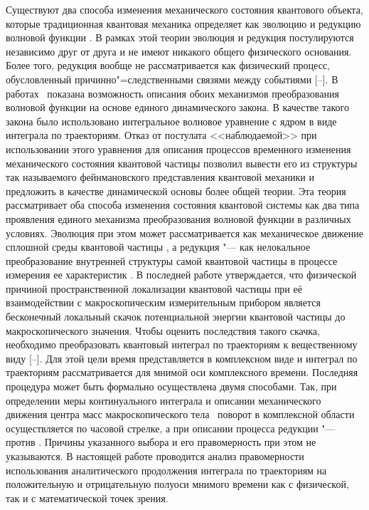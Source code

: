   Существуют два способа изменения механического состояния квантового объекта, которые традиционная квантовая механика определяет как эволюцию и редукцию волновой функции \cite{bib:E}. В рамках этой теории эволюция и редукция постулируются независимо друг от друга и не имеют никакого общего физического основания. Более того, редукция вообще не рассматривается как физический процесс, обусловленный причинно"=следственными связями между событиями [--]. В работах~\cite{bib:D,bib:L} показана возможность описания обоих механизмов преобразования волновой функции на основе единого динамического закона. В качестве такого закона было использовано интегральное волновое уравнение с ядром в виде интеграла по траекториям. Отказ от постулата <<наблюдаемой>> при использовании этого уравнения для описания процессов временного изменения механического состояния квантовой частицы позволил вывести его из структуры так называемого фейнмановского представления квантовой механики \cite{bib:F,bib:KV} и предложить в качестве динамической основы более общей теории. Эта теория рассматривает оба способа изменения состояния квантовой системы как два типа проявления единого механизма преобразования волновой функции в различных условиях. Эволюция при этом может рассматривается как механическое движение сплошной среды квантовой частицы  \cite{bib:V}, а редукция "--- как нелокальное преобразование внутренней структуры самой квантовой частицы в процессе измерения ее характеристик \cite{bib:PRL}.
 В последней работе утверждается, что физической причиной пространственной локализации квантовой частицы при её взаимодействии с макроскопическим измерительным прибором является бесконечный локальный скачок потенциальной энергии квантовой частицы до макроскопического значения. Чтобы оценить последствия такого скачка, необходимо преобразовать квантовый интеграл по траекториям к вещественному виду [--]. Для этой цели время представляется в комплексном виде и интеграл по траекториям рассматривается для мнимой оси комплексного времени. Последняя процедура может быть формально осуществлена двумя способами. Так, при определении меры континуального интеграла \cite{bib:EDK} и описании механического движения центра масс макроскопического тела~\cite{bib:KSV} поворот в комплексной области осуществляется по часовой стрелке, а при описании процесса редукции "--- против  \cite{bib:PRL}. Причины указанного выбора и его правомерность при этом не указываются. В настоящей работе проводится анализ правомерности использования аналитического продолжения интеграла по траекториям на положительную и отрицательную полуоси мнимого времени как с физической, так и с математической точек зрения.

